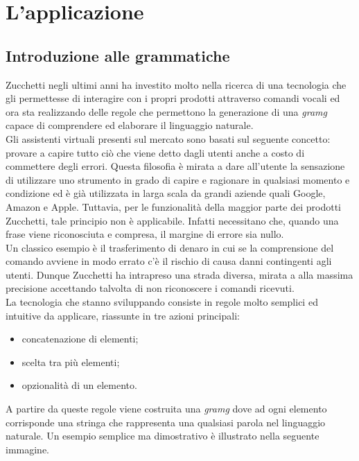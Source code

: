 
\chapter{L'applicazione}
\label{cap:applicazione}


\section{Introduzione alle grammatiche}
Zucchetti negli ultimi anni ha investito molto nella ricerca di una tecnologia che gli permettesse di interagire con i propri prodotti attraverso comandi vocali ed ora sta realizzando delle regole che permettono la generazione di una \emph{\gls{gramg}} capace di comprendere ed elaborare il linguaggio naturale. \\
Gli assistenti virtuali presenti sul mercato sono basati sul seguente concetto: provare a capire tutto ciò che viene detto dagli utenti anche a costo di commettere degli errori. Questa filosofia è mirata a dare all'utente la sensazione di utilizzare uno strumento in grado di capire e ragionare in qualsiasi momento e condizione ed è già utilizzata in larga scala da grandi aziende quali Google, Amazon e Apple. Tuttavia, per le funzionalità della maggior parte dei prodotti Zucchetti, tale principio non è applicabile. Infatti necessitano che, quando una frase viene riconosciuta e compresa, il margine di errore sia nullo. \\
Un classico esempio è il trasferimento di denaro in cui se la comprensione del comando avviene in modo errato c'è il rischio di causa danni contingenti agli utenti. Dunque Zucchetti ha intrapreso una strada diversa, mirata a alla massima precisione accettando talvolta di non riconoscere i comandi ricevuti. \\
La tecnologia che stanno sviluppando consiste in regole molto semplici ed intuitive da applicare, riassunte in tre azioni principali:
\begin{itemize}
	\item concatenazione di elementi;
	\item scelta tra più elementi;
	\item opzionalità di un elemento.
\end{itemize}
A partire da queste regole viene costruita una \emph{\gls{gramg}} dove ad ogni elemento corrisponde una stringa che rappresenta una qualsiasi parola nel linguaggio naturale. Un esempio semplice ma dimostrativo è illustrato nella seguente immagine.

